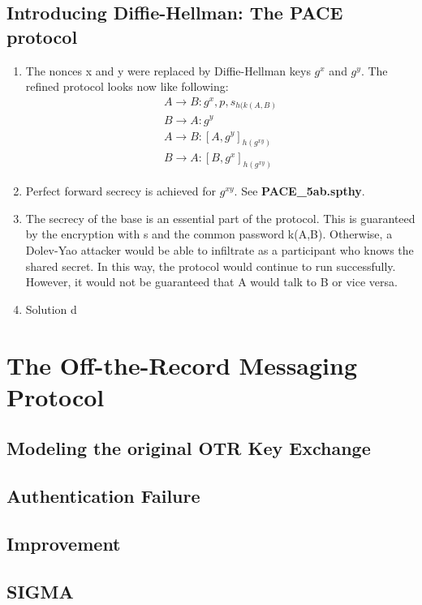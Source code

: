 \documentclass[a4paper,11pt]{scrartcl}
\begin{document}
\subsection{Introducing Diffie-Hellman: The PACE protocol}
\begin{enumerate}[label=\alph*)]
	\item The nonces x and y were replaced by Diffie-Hellman keys $g^x$ and $g^y$. The refined protocol looks now like following:
	  \begin{align*}
    		A \rightarrow B: g^x, p, {s}_{h(k(A,  B)}\\
		B \rightarrow A: g^y\\
		A \rightarrow B: [A,  g^y]_{h(g^{xy})}\\
		B \rightarrow A: [B,  g^x]_{h(g^{xy})}
  	\end{align*}
	\item Perfect forward secrecy is achieved for $g^{xy}$.  See \textbf{PACE_5ab.spthy}.
	\item The secrecy of the base is an essential part of the protocol. This is guaranteed by the encryption with s and the common password k(A,B).  Otherwise, a Dolev-Yao 				attacker would be able to infiltrate as a participant who knows the shared secret.  In this way, the protocol would continue to run successfully. However, it would not be 
	guaranteed that A would talk to B or vice versa.
	\item Solution d
\end{enumerate}
\section{The Off-the-Record Messaging Protocol}
\subsection{Modeling the original OTR Key Exchange}
\subsection{Authentication Failure}
\subsection{Improvement}
\subsection{SIGMA}
\end{document}
